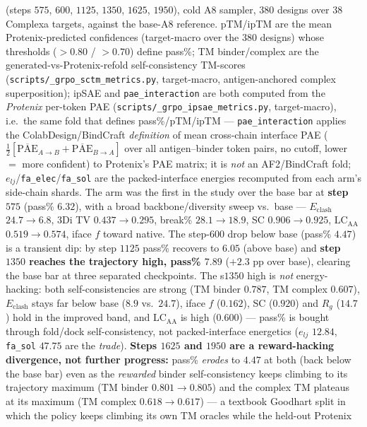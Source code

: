 \documentclass[11pt]{article}
\newcommand{\ttk}[1]{\texttt{\small #1}}
\begin{document}
\begin{table}[htbp]
{(steps $575$, $600$, $1125$, $1350$, $1625$, $1950$), cold A8 sampler, $380$ designs over $38$ Complexa targets,
against the base-A8 reference. pTM/ipTM are the mean Protenix-predicted confidences (target-macro over the
$380$ designs) whose thresholds ($>\!0.80$ / $>\!0.70$) define pass\%; TM binder/complex are the
generated-vs-Protenix-refold self-consistency TM-scores (\ttk{scripts/\_grpo\_sctm\_metrics.py}, target-macro,
antigen-anchored complex superposition); ipSAE and \ttk{pae\_interaction} are both computed from the
\emph{Protenix} per-token PAE (\ttk{scripts/\_grpo\_ipsae\_metrics.py}, target-macro), i.e.\ the same fold that
defines pass\%/pTM/ipTM --- \ttk{pae\_interaction} applies the ColabDesign/BindCraft \emph{definition} of mean
cross-chain interface PAE ($\tfrac12[\overline{\mathrm{PAE}}_{A\to B}+\overline{\mathrm{PAE}}_{B\to A}]$ over all
antigen--binder token pairs, no cutoff, lower $=$ more confident) to Protenix's PAE matrix; it is \emph{not} an
AF2/BindCraft fold; $e_{lj}$/\ttk{fa\_elec}/\ttk{fa\_sol} are the packed-interface
energies recomputed from each arm's side-chain shards. The arm was the first in the study over the base bar
at \textbf{step $575$} (pass\% $6.32$), with a broad backbone/diversity sweep vs.\ base --- $E_{\mathrm{clash}}$
$24.7\!\to\!6.8$, 3Di TV $0.437\!\to\!0.295$, break\% $28.1\!\to\!18.9$, SC $0.906\!\to\!0.925$,
$\mathrm{LC}_{\mathrm{AA}}$ $0.519\!\to\!0.574$, iface $f$ toward native. The step-$600$ drop below base
(pass\% $4.47$) is a transient dip: by step $1125$ pass\% recovers to $6.05$ (above base) and \textbf{step
$1350$ reaches the trajectory high, pass\% $\mathbf{7.89}$} ($+2.3$ pp over base), clearing the base bar at
three separated checkpoints. The s$1350$ high is \emph{not} energy-hacking: both self-consistencies are strong
(TM binder $0.787$, TM complex $0.607$), $E_{\mathrm{clash}}$ stays far below base ($8.9$ vs.\ $24.7$), iface
$f$ ($0.162$), SC ($0.920$) and $R_g$ ($14.7$) hold in the improved band, and $\mathrm{LC}_{\mathrm{AA}}$ is
high ($0.600$) --- pass\% is bought through fold/dock self-consistency, not packed-interface energetics
($e_{lj}$ $12.84$, \ttk{fa\_sol} $47.75$ are the \emph{trade}). \textbf{Steps $1625$ and $1950$ are a
reward-hacking divergence, not further progress:} pass\% \emph{erodes} to $4.47$ at both (back below the base
bar) even as the \emph{rewarded} binder self-consistency keeps climbing to its trajectory maximum (TM binder
$0.801\!\to\!\mathbf{0.805}$) and the complex TM plateaus at its maximum (TM complex $\mathbf{0.618}\!\to\!0.617$)
--- a textbook Goodhart split in which the policy keeps climbing its own TM oracles while the held-out Protenix
}
\end{table}
\end{document}
